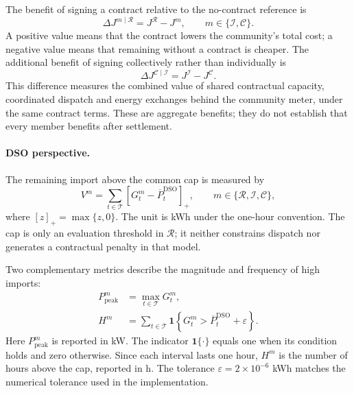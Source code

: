 The benefit of signing a contract relative to the no-contract reference is
\begin{equation}
\Delta J^{m\mid\mathcal R}
= J^{\mathcal R}-J^m,
\qquad m\in\{\mathcal I,\mathcal C\}.
\label{eq:q1-metrics-gain-reference}
\end{equation}
A positive value means that the contract lowers the community's total
cost; a negative value means that remaining without a contract is cheaper.
The additional benefit of signing collectively rather than individually is
\begin{equation}
\Delta J^{\mathcal C\mid\mathcal I}
= J^{\mathcal I}-J^{\mathcal C}.
\label{eq:q1-metrics-gain-pooling}
\end{equation}
This difference measures the combined value of shared contractual capacity,
coordinated dispatch and energy exchanges behind the community meter,
under the same contract terms. These are aggregate benefits; they do not
establish that every member benefits after settlement.

\paragraph{DSO perspective.}
The remaining import above the common cap is measured by
\begin{equation}
V^m
= \sum_{t\in\mathcal T}
  \left[G_t^m-\overline P_t^{\mathrm{DSO}}\right]_+,
\qquad m\in\{\mathcal R,\mathcal I,\mathcal C\},
\label{eq:q1-metrics-exceedance}
\end{equation}
where $[z]_+=\max\{z,0\}$. The unit is kWh under the one-hour convention.
The cap is only an evaluation threshold in $\mathcal R$; it neither
constrains dispatch nor generates a contractual penalty in that model.

Two complementary metrics describe the magnitude and frequency of high
imports:
\begin{align}
P_{\mathrm{peak}}^m
&= \max_{t\in\mathcal T}G_t^m,
\label{eq:q1-metrics-peak}\\
H^m
&= \sum_{t\in\mathcal T}
\mathbf{1}\!\left\{
G_t^m>\overline P_t^{\mathrm{DSO}}+\varepsilon
\right\}.
\label{eq:q1-metrics-hours}
\end{align}
Here $P_{\mathrm{peak}}^m$ is reported in kW. The indicator
$\mathbf{1}\{\cdot\}$ equals one when its condition holds and zero otherwise.
Since each interval lasts one hour, $H^m$ is the number of hours above the
cap, reported in h. The tolerance $\varepsilon=2\times10^{-6}$ kWh
matches the numerical tolerance used in the implementation.

